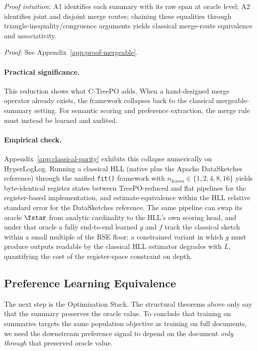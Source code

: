 \noindent\textit{Proof intuition:} A1 identifies each summary with its raw span at oracle level; A2 identifies joint and disjoint merge routes; chaining these equalities through triangle-inequality/congruence arguments yields classical merge-route equivalence and associativity.

\noindent\textit{Proof:} See Appendix~\ref{app:proof-mergeable}.

\paragraph{Practical significance.}
This reduction shows what C-TreePO adds. When a hand-designed merge operator already exists, the framework collapses back to the classical mergeable-summary setting. For semantic scoring and preference extraction, the merge rule must instead be learned and audited.

\paragraph{Empirical check.}
Appendix~\ref{app:classical-parity} exhibits this collapse numerically on HyperLogLog. Running a classical HLL (native plus the Apache DataSketches reference) through the unified \texttt{fit()} framework with $n_{\mathrm{leaves}} \in \{1, 2, 4, 8, 16\}$ yields byte-identical register states between TreePO-reduced and flat pipelines for the register-based implementation, and estimate-equivalence within the HLL relative standard error for the DataSketches reference. The same pipeline can swap its oracle $\fstar$ from analytic cardinality to the HLL's own scoring head, and under that oracle a fully end-to-end learned $g$ and $f$ track the classical sketch within a small multiple of the RSE floor; a constrained variant in which $g$ must produce outputs readable by the classical HLL estimator degrades with $L$, quantifying the cost of the register-space constraint on depth.

\subsection{Preference Learning Equivalence}

The next step is the Optimization Stack. The structural theorems above only say that the summary preserves the oracle value. To conclude that training on summaries targets the same population objective as training on full documents, we need the downstream preference signal to depend on the document \emph{only through} that preserved oracle value.

